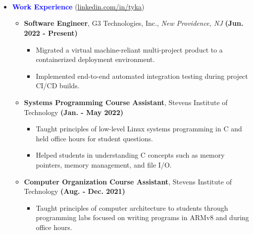 \documentclass[11pt]{article}
\begin{document}
\begin{flushleft}

    \makebox[\textwidth]{\LARGE \textbf{\textcolor{teal}{Tyler Kaminski}}}\\

\\
\\

\setlength{\parindent}{0.5in}

\begin{itemize}
    \item[] \Large \textcolor{blue}{\textbf{Work Experience}} (\href{https://linkedin.com/in/tyka}{linkedin.com/in/tyka}) \normalsize
        \begin{itemize}
            \item \textbf{Software Engineer}, G3 Technologies, Inc., \textit{New Providence, NJ} \hfill{\textbf{(Jun. 2022 - Present)}}
                \begin{itemize}
                    \item Migrated a virtual machine-reliant multi-project product to a containerized deployment environment.
                    \item Implemented end-to-end automated integration testing during project CI/CD builds.
                \end{itemize}
            \item \textbf{Systems Programming Course Assistant}, Stevens Institute of Technology \hfill{\textbf{(Jan. - May 2022)}}
                \begin{itemize}
                    \item Taught principles of low-level Linux systems programming in C and held office hours for student questions.
                    \item Helped students in understanding C concepts such as memory pointers, memory management, and file I/O.
                \end{itemize}
            \item \textbf{Computer Organization Course Assistant}, Stevens Institute of Technology \hfill{\textbf{(Aug. - Dec. 2021)}}
                \begin{itemize}
                    \item Taught principles of computer architecture to students through programming labs focused on writing programs in ARMv8 and during office hours.

\end{itemize}
\end{itemize}
\end{itemize}
\end{flushleft}
\end{document}
